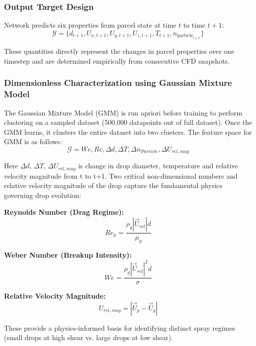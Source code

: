 \documentclass[letterpaper,twocolumn,10pt]{article}
\begin{document}
\subsubsection{Output Target Design}

Network predicts six properties from parcel state at time $t$ to time $t+1$:
\begin{equation}
\mathcal{Y} = \{d_{t+1},U_{x,t+1},U_{y,t+1},U_{z,t+1}, T_{t+1},n_{\text{particle}_{t+1}}\}
\end{equation}

These quantities directly represent the changes in parcel properties over one timestep and are determined empirically from consecutive CFD snapshots.

\subsubsection{Dimensionless Characterization using Gaussian Mixture Model}

The Gaussian Mixture Model (GMM) is run apriori before training to perform clustering on a sampled dataset (500,000 datapoints out of full dataset). Once the GMM learns, it clusters the entire dataset into two clusters. The feature space for GMM is as follows:
\begin{equation}
\mathcal{G} = {We, Re, \Delta d, \Delta T, \Delta n_{Particle}, \Delta U_{rel, mag} }
\end{equation}

Here $\Delta d$, $\Delta T$, $\Delta U_{rel,mag}$ is change in drop diameter, temperature and relative velocity magnitude from t to t+1. Two critical non-dimensional numbers and relative velocity magnitude of the drop capture the fundamental physics governing drop evolution:

\textbf{Reynolds Number (Drag Regime):}
\begin{equation}
Re_p = \frac{\rho_g |\vec{U}_{rel}| d}{\mu_g}
\end{equation}

\textbf{Weber Number (Breakup Intensity):}
\begin{equation}
We = \frac{\rho_g |\vec{U}_{rel}|^2 d}{\sigma}
\end{equation}

\textbf{Relative Velocity Magnitude:}
\begin{equation}
U_{rel,mag} = |\vec{U}_p - \vec{U}_g|
\end{equation}

These provide a physics-informed basis for identifying distinct spray regimes (small drops at high shear vs. large drops at low shear).
\end{document}
